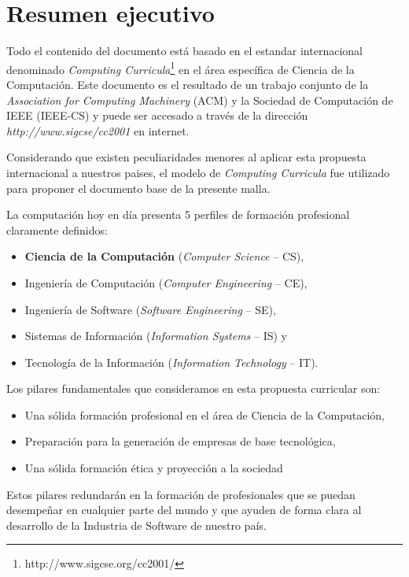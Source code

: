  \chapter*{Resumen ejecutivo}
\AbstractIntro

Todo el contenido del documento está basado en el estandar internacional denominado \textit{Computing Curricula}\footnote{http://www.sigcse.org/cc2001/} en el área específica de Ciencia de la Computación. Este documento es el resultado de un trabajo conjunto de la \textit{Association for Computing Machinery} (ACM) y la Sociedad de Computación de IEEE (IEEE-CS) y puede ser accesado a través de la dirección \textit{http://www.sigcse/cc2001} en internet.

Considerando que existen peculiaridades menores al aplicar esta propuesta internacional a nuestros paises, el modelo de \textit{Computing Curricula} fue utilizado para proponer el documento base de la presente malla. 

\noindent La computación hoy en día presenta 5 perfiles de formación profesional claramente definidos: 
\begin{itemize}
\item \textbf{Ciencia de la Computación} (\textit{Computer Science} -- CS),
\item Ingeniería de Computación (\textit{Computer Engineering} -- CE),
\item Ingeniería de Software (\textit{Software Engineering} -- SE),
\item Sistemas de Información (\textit{Information Systems} -- IS) y 
\item Tecnología de la Información (\textit{Information Technology} -- IT).
\end{itemize}

Los pilares fundamentales que consideramos en esta propuesta curricular son:
\begin{itemize}
\item Una sólida formación profesional en el área de Ciencia de la Computación,
\item Preparación para la generación de empresas de base tecnológica,
\item Una sólida formación ética y proyección a la sociedad
\end{itemize}

Estos pilares redundarán en la formación de profesionales que se puedan desempeñar en cualquier parte del mundo y que ayuden de forma clara al desarrollo de la Industria de Software de nuestro país. 

